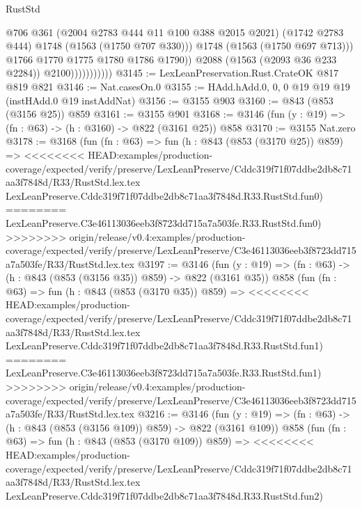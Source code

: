 \begin{lexlean}{RustStd}
\begin{coremodule}
{\begin{coremodule}
{{{{{{{{                                  @706
                                  @361
                                  (@2004 @2783 @444 @11 @100 @388 @2015 @2021)
                                  (@1742 @2783 @444)
                                  @1748
                                  (@1563 (@1750 @707 @330)))
                                @1748
                                (@1563 (@1750 @697 @713)))
                              @1766
                              @1770
                              @1775
                              @1780
                              @1786
                              @1790))
                          @2088
                          (@1563 (@2093 @36 @233 @2284))
                          @2100)))))))))))
@3145 := LexLeanPreservation.Rust.CrateOK @817 @819 @821
@3146 := Nat.casesOn.{0}
@3155 := HAdd.hAdd.{0, 0, 0} @19 @19 @19 (instHAdd.{0} @19 instAddNat)
@3156 := @3155 @903
@3160 := @843 (@853 (@3156 @25)) @859
@3161 := @3155 @901
@3168 := @3146 (fun (y : @19) => (fn : @63) -> (h : @3160) -> @822 (@3161 @25)) @858
@3170 := @3155 Nat.zero
@3178 := @3168
    (fun (fn : @63) =>
    fun (h : @843 (@853 (@3170 @25)) @859) =>
<<<<<<<< HEAD:examples/production-coverage/expected/verify/preserve/LexLeanPreserve/Cddc319f71f07ddbe2db8c71aa3f7848d/R33/RustStd.lex.tex
    LexLeanPreserve.Cddc319f71f07ddbe2db8c71aa3f7848d.R33.RustStd.fun0)
========
    LexLeanPreserve.C3e46113036eeb3f8723dd715a7a503fe.R33.RustStd.fun0)
>>>>>>>> origin/release/v0.4:examples/production-coverage/expected/verify/preserve/LexLeanPreserve/C3e46113036eeb3f8723dd715a7a503fe/R33/RustStd.lex.tex
@3197 := @3146
    (fun (y : @19) => (fn : @63) -> (h : @843 (@853 (@3156 @35)) @859) -> @822 (@3161 @35))
    @858
    (fun (fn : @63) =>
    fun (h : @843 (@853 (@3170 @35)) @859) =>
<<<<<<<< HEAD:examples/production-coverage/expected/verify/preserve/LexLeanPreserve/Cddc319f71f07ddbe2db8c71aa3f7848d/R33/RustStd.lex.tex
    LexLeanPreserve.Cddc319f71f07ddbe2db8c71aa3f7848d.R33.RustStd.fun1)
========
    LexLeanPreserve.C3e46113036eeb3f8723dd715a7a503fe.R33.RustStd.fun1)
>>>>>>>> origin/release/v0.4:examples/production-coverage/expected/verify/preserve/LexLeanPreserve/C3e46113036eeb3f8723dd715a7a503fe/R33/RustStd.lex.tex
@3216 := @3146
    (fun (y : @19) => (fn : @63) -> (h : @843 (@853 (@3156 @109)) @859) -> @822 (@3161 @109))
    @858
    (fun (fn : @63) =>
    fun (h : @843 (@853 (@3170 @109)) @859) =>
<<<<<<<< HEAD:examples/production-coverage/expected/verify/preserve/LexLeanPreserve/Cddc319f71f07ddbe2db8c71aa3f7848d/R33/RustStd.lex.tex
    LexLeanPreserve.Cddc319f71f07ddbe2db8c71aa3f7848d.R33.RustStd.fun2)
}}}}}}}}
\end{coremodule}}
\end{coremodule}
\end{lexlean}
